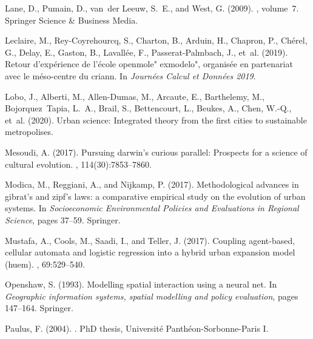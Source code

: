 \documentclass[10pt,letterpaper]{article}
\begin{document}
\begin{thebibliography}{}
Lane, D., Pumain, D., van~der Leeuw, S.~E., and West, G. (2009).
,
  volume~7.
\newblock Springer Science \& Business Media.

Leclaire, M., Rey-Coyrehourcq, S., Charton, B., Arduin, H., Chapron, P.,
  Ch{\'e}rel, G., Delay, E., Gaston, B., Lavall{\'e}e, F., Passerat-Palmbach,
  J., et~al. (2019).
\newblock Retour d'exp{\'e}rience de l'{\'e}cole openmole" exmodelo",
  organis{\'e}e en partenariat avec le m{\'e}so-centre du criann.
\newblock In {\em Journ{\'e}es Calcul et Donn{\'e}es 2019}.

Lobo, J., Alberti, M., Allen-Dumas, M., Arcaute, E., Barthelemy, M.,
  Bojorquez~Tapia, L.~A., Brail, S., Bettencourt, L., Beukes, A., Chen, W.-Q.,
  et~al. (2020).
\newblock Urban science: Integrated theory from the first cities to sustainable
  metropolises.

Mesoudi, A. (2017).
\newblock Pursuing darwin’s curious parallel: Prospects for a science of
  cultural evolution.
,
  114(30):7853--7860.

Modica, M., Reggiani, A., and Nijkamp, P. (2017).
\newblock Methodological advances in gibrat’s and zipf’s laws: a
  comparative empirical study on the evolution of urban systems.
\newblock In {\em Socioeconomic Environmental Policies and Evaluations in
  Regional Science}, pages 37--59. Springer.

Mustafa, A., Cools, M., Saadi, I., and Teller, J. (2017).
\newblock Coupling agent-based, cellular automata and logistic regression into
  a hybrid urban expansion model (huem).
, 69:529--540.

Openshaw, S. (1993).
\newblock Modelling spatial interaction using a neural net.
\newblock In {\em Geographic information systems, spatial modelling and policy
  evaluation}, pages 147--164. Springer.

Paulus, F. (2004).
.
\newblock PhD thesis, Universit{\'e} Panth{\'e}on-Sorbonne-Paris I.


\end{thebibliography}
\end{document}
